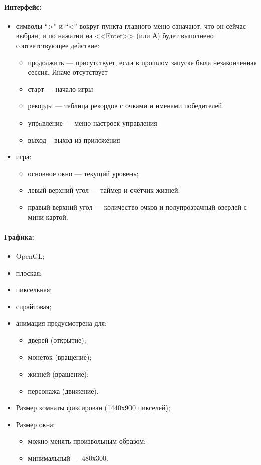 \documentclass[12pt,a4paper,fullpage]{article}
\begin{document}
\paragraph{Интерфейс:}
\begin{itemize}
	\item символы ``>'' и ``<'' вокруг пункта главного меню означают, что он сейчас выбран, и по нажатии на <<Enter>> (или А) будет выполнено соответствующее действие:
	\begin{itemize}
		\item продолжить --- присутствует, если в прошлом запуске была незаконченная сессия. Иначе отсутствует
		\item старт --- начало игры
		\item рекорды --- таблица рекордов с очками и именами победителей
		\item упрaвление --- меню настроек управления
		\item выход -- выход из приложения\\
	\end{itemize}
	\item игра:	
	\begin{itemize}
		\item основное окно --- текущий уровень;
		\item левый верхний угол --- таймер и счётчик жизней. 
		\item правый верхний угол --- количество очков и полупрозрачный оверлей с мини-картой.
	\end{itemize}
\end{itemize}

\paragraph{Графика:}
\begin{itemize}
	\item OpenGL;
	\item плоская;
	\item пиксельная;
	\item спрайтовая;
	\item анимация предусмотрена для:
	\begin{itemize}
		\item дверей (открытие);
		\item монеток (вращение);
		\item жизней (вращение);
		\item персонажа (движение).
	\end{itemize}
	\item Размер комнаты фиксирован (1440х900 пикселей);
	\item Размер окна:
	\begin{itemize}
		\item можно менять произвольным образом;
		\item минимальный --- 480х300.
	\end{itemize}
\end{itemize}
\end{document}
